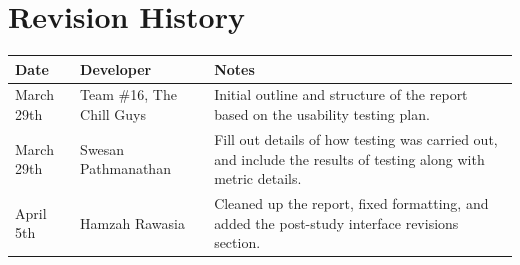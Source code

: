\section{Revision History}

\begin{tabularx}{\textwidth}{llX}
\toprule {\bf Date} & {\bf Developer} & {\bf Notes}\\
\midrule
March 29th & Team \#16, The Chill Guys & Initial outline and structure of the report based on the usability testing plan.\\
March 29th & Swesan Pathmanathan & Fill out details of how testing was carried out, and include the results of testing along with metric details.\\
April 5th & Hamzah Rawasia & Cleaned up the report, fixed formatting, and added the post-study interface revisions section.\\
\bottomrule
\end{tabularx}

~\newpage
